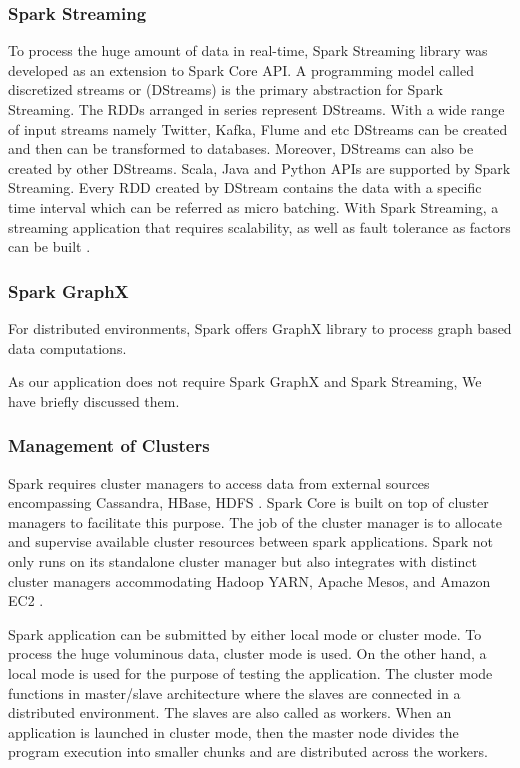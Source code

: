 \subsubsection{Spark Streaming}

To process the huge amount of data in real-time, Spark Streaming library was developed as an extension to Spark Core API. A programming model called discretized streams or (DStreams) is the primary abstraction for Spark Streaming. The RDDs arranged in series represent DStreams. With a wide range of input streams namely Twitter, Kafka, Flume and etc DStreams can be created and then can be transformed to databases. Moreover, DStreams can also be created by other DStreams. Scala, Java and Python APIs are supported by Spark Streaming. Every RDD created by DStream contains the data with a specific time interval which can be referred as micro batching. With Spark Streaming, a streaming application that requires scalability, as well as fault tolerance as factors can be built \cite{spark:website}.

\subsubsection{Spark GraphX}
 For distributed environments, Spark offers GraphX library to process graph based data computations. 

As our application does not require Spark GraphX and Spark Streaming, We have briefly discussed them.

\subsubsection{Management of Clusters}
\label{section: management of clusters}
Spark requires cluster managers to access data from external sources encompassing Cassandra, HBase, HDFS \cite{Jonnalagadda2016}. Spark Core is built on top of cluster managers to facilitate this purpose. The job of the cluster manager is to allocate and supervise available cluster resources between spark applications. Spark not only runs on its standalone cluster manager but also integrates with distinct cluster managers accommodating Hadoop YARN, Apache Mesos, and Amazon EC2 \cite{karau2015learning}.


\par Spark application can be submitted by either local mode or cluster mode. To process the huge voluminous data, cluster mode is used. On the other hand, a local mode is used for the purpose of testing the application. The cluster mode functions in master/slave architecture where the slaves are connected in a distributed environment. The slaves are also called as workers. When an application is launched in cluster mode, then the master node divides the program execution into smaller chunks and are distributed across the workers.

